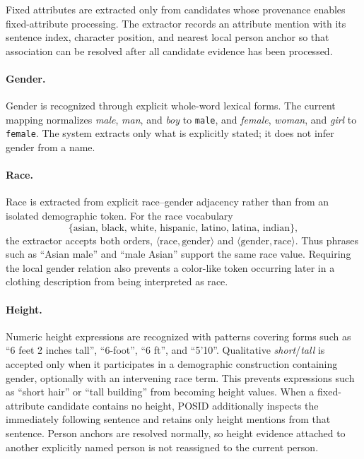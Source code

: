 \documentclass[sigconf,nonacm]{acmart}
\newcommand{\posid}{\textsc{POSID}}
\begin{document}
Fixed attributes are extracted only from candidates whose provenance enables
fixed-attribute processing.  The extractor records an attribute mention with
its sentence index, character position, and nearest local person anchor so that
association can be resolved after all candidate evidence has been processed.

\paragraph{Gender.}
Gender is recognized through explicit whole-word lexical forms.  The current
mapping normalizes \emph{male}, \emph{man}, and \emph{boy} to \texttt{male},
and \emph{female}, \emph{woman}, and \emph{girl} to \texttt{female}.  The
system extracts only what is explicitly stated; it does not infer gender from a
name.

\paragraph{Race.}
Race is extracted from explicit race--gender adjacency rather than from an
isolated demographic token.  For the race vocabulary
\[
\{\text{asian, black, white, hispanic, latino, latina, indian}\},
\]
the extractor accepts both orders, $\langle\text{race},\text{gender}\rangle$
and $\langle\text{gender},\text{race}\rangle$.  Thus phrases such as
``Asian male'' and ``male Asian'' support the same race value.  Requiring the
local gender relation also prevents a color-like token occurring later in a
clothing description from being interpreted as race.

\paragraph{Height.}
Numeric height expressions are recognized with patterns covering forms such as
``6 feet 2 inches tall'', ``6-foot'', ``6 ft'', and ``5'10\textquotedbl''.
Qualitative \emph{short}/\emph{tall} is accepted only when it participates in a
demographic construction containing gender, optionally with an intervening race
term.  This prevents expressions such as ``short hair'' or ``tall building''
from becoming height values.  When a fixed-attribute candidate contains no
height, \posid{} additionally inspects the immediately following sentence and
retains only height mentions from that sentence.  Person anchors are resolved
normally, so height evidence attached to another explicitly named person is
not reassigned to the current person.
\end{document}

